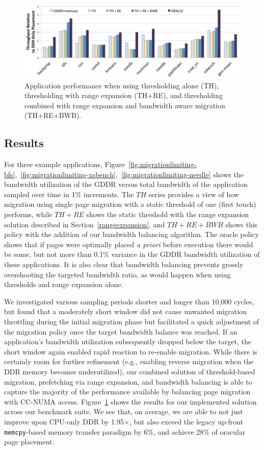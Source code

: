 \begin{figure}[thp]
    \includegraphics[width=\textwidth]{hpca2015/figures/final.png}
    \caption{Application performance when using thresholding alone (TH), thresholding with range expansion (TH+RE), and thresholding combined with range expansion and bandwidth aware migration (TH+RE+BWB).}
    \label{fig:final}
\end{figure}

\subsection{Results}
For three example applications,
Figure~\ref{fig:migrationlimiting-bfs},~\ref{fig:migrationlimiting-xsbench},~\ref{fig:migrationlimiting-needle}
shows the bandwidth utilization of the GDDR versus total bandwidth of the application sampled over time
in 1\% increments.  The $TH$ series provides a view of how migration using single page
migration with a static threshold of one (first touch) performs, while $TH+RE$ shows the static threshold with the range expansion
solution described in Section~\ref{rangeexpansion}, and $TH+RE+BWB$ shows this policy with the addition of our
bandwidth balancing algorithm.  The oracle policy shows that if pages were optimally placed \emph{a priori} before execution there would be some,
but not more than 0.1\% variance in the GDDR bandwidth utilization of these applications.  It is also clear that
bandwidth balancing prevents grossly overshooting the targeted bandwidth ratio, as would happen when using thresholds and range expansion alone.

We investigated various sampling periods shorter and longer than 10,000 cycles, but
found that a moderately short window did not cause unwanted migration throttling during the initial
migration phase but facilitated a quick adjustment of the migration policy once the target bandwidth balance was reached.
If an application's bandwidth utilization subsequently dropped below the target, the short window again enabled rapid
reaction to re-enable migration.   While there is certainly room for further refinement (e.g., enabling 
reverse migration when the DDR memory becomes underutilized), our combined solution of threshold-based migration, prefetching via range expansion, and bandwidth balancing is able to capture the majority of the performance available by balancing page migration
with CC-NUMA access.  Figure~\ref{fig:final} shows the results for our implemented solution across
our benchmark suite.  We see that, on average, we are able to not just improve
upon CPU-only DDR by 1.95$\times$,
but also exceed the legacy up-front {\tt memcpy}-based memory transfer paradigm by 6\%,
and achieve 28\% of oracular page placement.

